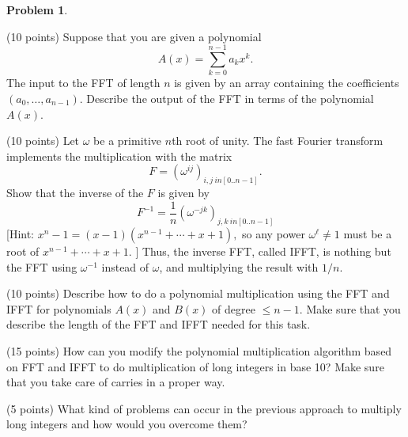 \documentclass{article}
\theoremstyle{definition}
\newtheorem{problem}{Problem}
\begin{document}
\begin{problem} 
\begin{compactenum}[(a)]
\item (10 points) Suppose that you are given a polynomial 
$$ A(x) = \sum_{k=0}^{n-1} a_k x^k.$$ 
The input to the FFT of length $n$ is given by an array containing the coefficients
$(a_0,\ldots, a_{n-1})$. Describe the output of the FFT in terms of
the polynomial $A(x)$. 

\item (10 points) Let $\omega$ be a primitive $n$th root of unity. 
The fast Fourier transform implements the multiplication with
  the matrix 
$$ F = (\omega^{ij})_{i,j\ in [0..n-1]}.$$
Show that the inverse of the $F$ is given by 
$$ F^{-1} = \frac{1}{n}  (\omega^{-jk})_{j,k\ in [0..n-1]}$$
[Hint: $x^n-1= (x-1)(x^{n-1}+\cdots + x + 1),$ so any power
$\omega^\ell\neq 1$  must be a root of $x^{n-1}+\cdots + x + 1$.  ]  
Thus, the inverse FFT, called IFFT, is nothing but the FFT using
$\omega^{-1}$ instead of $\omega$, and multiplying the result with
$1/n$. 
\item (10 points) Describe how to do a polynomial multiplication using the FFT and
  IFFT for polynomials $A(x)$ and $B(x)$ of degree $\le n-1$. Make
  sure that you describe the length of the FFT and IFFT needed for
  this task. 
\item (15 points) How can you modify the polynomial multiplication algorithm based
  on FFT and IFFT to do multiplication of long integers in base 10?
  Make sure that you take care of carries in a proper way. 
\item (5 points) What kind of problems can occur in the previous
  approach to multiply long integers and how would you overcome them? 
\end{compactenum}
\end{problem}
\end{document}
